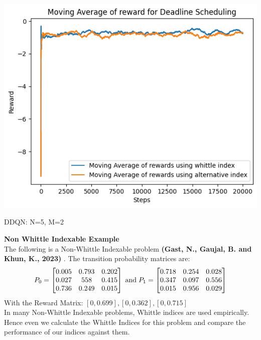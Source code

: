 \documentclass{slides}
\begin{document}
{{\begin{center}
\includegraphics[scale=0.75]{comparison_new.png}
\end{center}
\begin{small}
\vspace{-10mm}
\hspace{100mm}DDQN: N=5, M=2\end{small}
\newpage
\textbf{Non Whittle Indexable Example}\\
The following is a Non-Whittle Indexable problem \textbf{(Gast, N., Gaujal, B. and Khun, K., 2023)} . The transition probability matrices are: 
 \begin{align*}
P_0=
\begin{bmatrix}
0.005 & 0.793 & 0.202\\
0.027 & 558 & 0.415 \\
0.736&0.249&0.015
\end{bmatrix}
\hspace{1mm} \text{and} \hspace{1mm}
P_1=
\begin{bmatrix}
0.718 & 0.254 & 0.028\\
0.347 & 0.097 & 0.556 \\
0.015&0.956&0.029
\end{bmatrix}
\end{align*}
With the Reward Matrix: $[0,0.699],[0,0.362],[0,0.715]$\\
In many Non-Whittle Indexable problems, Whittle indices are used empirically. Hence
even we calculate the Whittle Indices for this problem and compare the performance of our indices against
them.

}}
\end{document}
